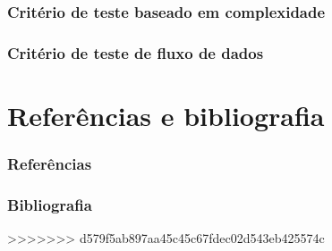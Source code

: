 \documentclass[utf8, usepdftitle=false, svgnames, color={table, fixpdftex, hyperref, fixinclude, xcdraw}, t, brazil]{beamer}
\begin{document}
		\section{Critério de teste baseado em complexidade}
		 

		\section{Critério de teste de fluxo de dados}
		  


	\part{Referências e bibliografia}

		\section{Referências}
		

		\section{Bibliografia}
		
	

% 		
>>>>>>> d579f5ab897aa45c45c67fdec02d543eb425574c
\end{document}
